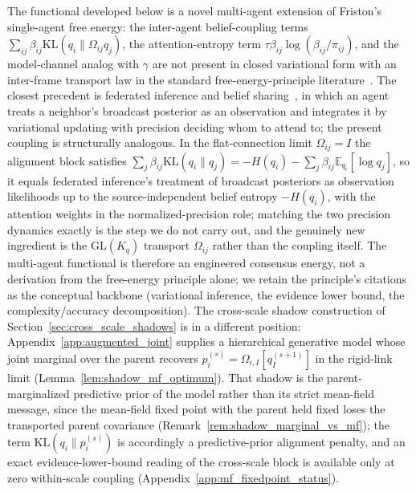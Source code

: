 \documentclass[11pt]{article}
\begin{document}
The functional developed below is a novel multi-agent extension of Friston's single-agent free energy: the inter-agent belief-coupling terms $\sum_{ij}\beta_{ij}\mathrm{KL}(q_i\|\Omega_{ij}q_j)$, the attention-entropy term $\tau\beta_{ij}\log(\beta_{ij}/\pi_{ij})$, and the model-channel analog with $\gamma$ are not present in closed variational form with an inter-frame transport law in the standard free-energy-principle literature~\cite{Friston2010, parr2022active}. The closest precedent is federated inference and belief sharing~\cite{friston2024federated}, in which an agent treats a neighbor's broadcast posterior as an observation and integrates it by variational updating with precision deciding whom to attend to; the present coupling is structurally analogous. In the flat-connection limit $\Omega_{ij} = I$ the alignment block satisfies $\sum_j \beta_{ij}\mathrm{KL}(q_i\|q_j) = -H(q_i) - \sum_j \beta_{ij}\mathbb{E}_{q_i}[\log q_j]$, so it equals federated inference's treatment of broadcast posteriors as observation likelihoods up to the source-independent belief entropy $-H(q_i)$, with the attention weights in the normalized-precision role; matching the two precision dynamics exactly is the step we do not carry out, and the genuinely new ingredient is the $\mathrm{GL}(K_q)$ transport $\Omega_{ij}$ rather than the coupling itself. The multi-agent functional is therefore an engineered consensus energy, not a derivation from the free-energy principle alone; we retain the principle's citations as the conceptual backbone (variational inference, the evidence lower bound, the complexity/accuracy decomposition). The cross-scale shadow construction of Section~\ref{sec:cross_scale_shadows} is in a different position: Appendix~\ref{app:augmented_joint} supplies a hierarchical generative model whose joint marginal over the parent recovers $p_i^{(s)} = \Omega_{i,I}[q_I^{(s+1)}]$ in the rigid-link limit (Lemma~\ref{lem:shadow_mf_optimum}). That shadow is the parent-marginalized predictive prior of the model rather than its strict mean-field message, since the mean-field fixed point with the parent held fixed loses the transported parent covariance (Remark~\ref{rem:shadow_marginal_vs_mf}); the term $\mathrm{KL}(q_i \| p_i^{(s)})$ is accordingly a predictive-prior alignment penalty, and an exact evidence-lower-bound reading of the cross-scale block is available only at zero within-scale coupling (Appendix~\ref{app:mf_fixedpoint_status}).
\end{document}
